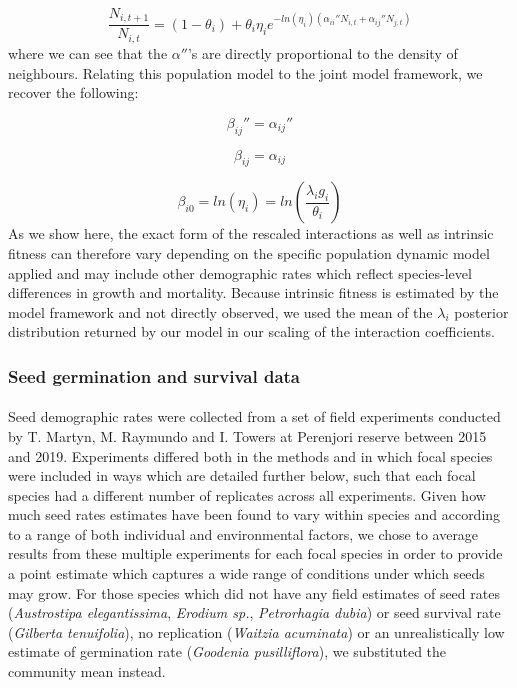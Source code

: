 \documentclass[a4,12pt]{article}
\begin{document}
        \begin{equation}
            \frac{N_{i, t+1}}{N_{i, t}} = (1 - \theta_{i}) + \theta_{i} \eta_{i} e^{-ln(\eta_{i})({\alpha_{ii}}'' N_{i, t} + {\alpha_{ij}}'' N_{j, t})}
        \end{equation}
        where we can see that the ${\alpha}''$'s are directly proportional to the density of neighbours. Relating this population model to the joint model framework, we recover the following: 

        \begin{equation}
        {\beta_{ij}}'' = {\alpha_{ij}}''
        \end{equation}

        \begin{equation}
        \beta_{ij} = \alpha_{ij}
        \end{equation}

        \begin{equation}
        \beta_{i0}  = ln(\eta_{i}) = ln(\frac{\lambda_{i} g_{i}}{\theta_{i}})
        \end{equation}
        As we show here, the exact form of the rescaled interactions as well as intrinsic fitness can therefore vary depending on the specific population dynamic model applied and may include other demographic rates which reflect species-level differences in growth and mortality. Because intrinsic fitness is estimated by the model framework and not directly observed, we used the mean of the $\lambda_{i}$ posterior distribution returned by our model in our scaling of the interaction coefficients.


        \subsubsection{Seed germination and survival data}
        \label{SI:germination}

        \paragraph{}
        Seed demographic rates were collected from a set of field experiments conducted by T. Martyn, M. Raymundo and I. Towers at Perenjori reserve between 2015 and 2019. Experiments differed both in the methods and in which focal species were included in ways which are detailed further below, such that each focal species had a different number of replicates across all experiments. Given how much seed rates estimates have been found to vary within species and according to a range of both individual and environmental factors, we chose to average results from these multiple experiments for each focal species in order to provide a point estimate which captures a wide range of conditions under which seeds may grow. For those species which did not have any field estimates of seed rates (\textit{Austrostipa elegantissima}, \textit{Erodium sp.}, \textit{Petrorhagia dubia}) or seed survival rate (\textit{Gilberta tenuifolia}), no replication (\textit{Waitzia acuminata}) or an unrealistically low estimate of germination rate (\textit{Goodenia pusilliflora}), we substituted the community mean instead. 
\end{document}
